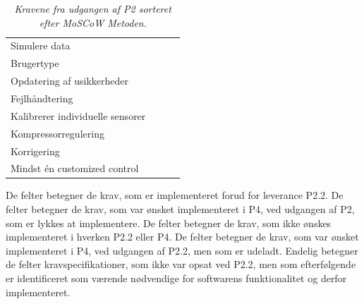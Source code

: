 \documentclass[Hovedrapport.tex]{subfiles}
\begin{document}
\begin{table}[H]
\begin{tabular}{|l|l|l|l|}
Simulere data \cellcolor{orange!25}      &                               &                                       &                       \\
Brugertype \cellcolor{green!25}         &                               &                                       &   \\
\cellcolor{yellow!25}Opdatering af usikkerheder              &                               &                                       & \\
\cellcolor{yellow!25}Fejlhåndtering                          &                               &                                       & \\
\cellcolor{yellow!25}Kalibrerer individuelle sensorer        &                               &                                       & \\
\cellcolor{yellow!25}Kompressorregulering & & & \\
\cellcolor{yellow!25}Korrigering & & & \\
\cellcolor{yellow!25}Mindst én customized control & & & \\
\bottomrule
	\end{tabular}
	\caption{\textit{Kravene fra udgangen af P2 sorteret efter MoSCoW Metoden}.}
	\label{tab:krav_sam}
	\vspace{-20pt}
\end{table}
De  felter betegner de krav, som er implementeret forud for leverance P2.2. De  felter betegner de krav, som var ønsket implementeret i P4, ved udgangen af P2, som er lykkes at implementere. De  felter betegner de krav, som ikke ønskes implementeret i hverken P2.2 eller P4. De  felter betegner de krav, som var ønsket implementeret i P4, ved udgangen af P2.2, men som er udeladt. Endelig betegner de  felter kravspecifikationer, som ikke var opsat ved P2.2, men som efterfølgende er identificeret som værende nødvendige for softwarens funktionalitet og derfor implementeret.
\newpage
\end{document}
